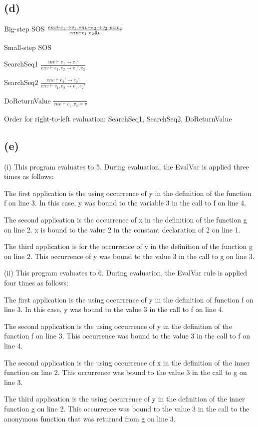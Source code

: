 \documentclass[11pt, oneside]{article}
\newcommand{\forceindent}{\leavevmode{\parindent=1.5em\indent}}
\begin{document}
\subsection*{(d)}
\forceindent \par Big-step SOS
$
\frac{
	env \vdash e_1 \rightarrow v_1 \thinspace \thinspace env \vdash e_2 \rightarrow v_2 \thinspace \thinspace v = v_2
}
{
	env \vdash e_1, e_2 \Downarrow v
}
$

\par Small-step SOS
\par SearchSeq1
$
\frac{
	env \vdash e_1 \rightarrow e_1'
}
{
	env \vdash e_1, e_2 \rightarrow e_1', e_2
}
$
\par SearchSeq2
$
\frac{
	env \vdash e_2' \rightarrow e_2'
}
{
	env \vdash v_1, e_2 \rightarrow v_1, e_2'
}
$
\par DoReturnValue
$
\frac{
}
{
	env \vdash v_1, v_2 = v
}
$
\par Order for right-to-left evaluation: SearchSeq1, SearchSeq2, DoReturnValue

\subsection*{(e)}
\forceindent \par (i) This program evaluates to 5. During evaluation, the EvalVar is applied three times as follows:
\par The first application is the using occurrence of y in the definition of the function f on line 3. In this case, y was bound to the variable 3 in the call to f on line 4. 
\par The second application is the occurrence of x in the definition of the function g on line 2. x is bound to the value 2 in the constant declaration of 2 on line 1.
\par The third application is for the occurrence of y in the definition of the function g on line 2. This occurrence of y was bound to the value 3 in the call to g on line 3.

\par (ii) This program evaluates to 6. During evaluation, the EvalVar rule is applied four times as follows:
\par The first application is the using occurrence of y in the definition of function f on line 3. In this case, y was bound to the value 3 in the call to f on line 4.
\par The second application is the using occurrence of y in the definition of the function f on line 3. This occurrence was bound to the value 3 in the call to f on line 4.
\par The second application is the using occurrence of x in the definition of the inner function on line 2. This occurrence was bound to the value 3 in the call to g on line 3.
\par The third application is the using occurrence of y in the definition of the inner function g on line 2. This occurrence was bound to the value 3 in the call to the anonymous function that was returned from g on line 3.
\end{document}
